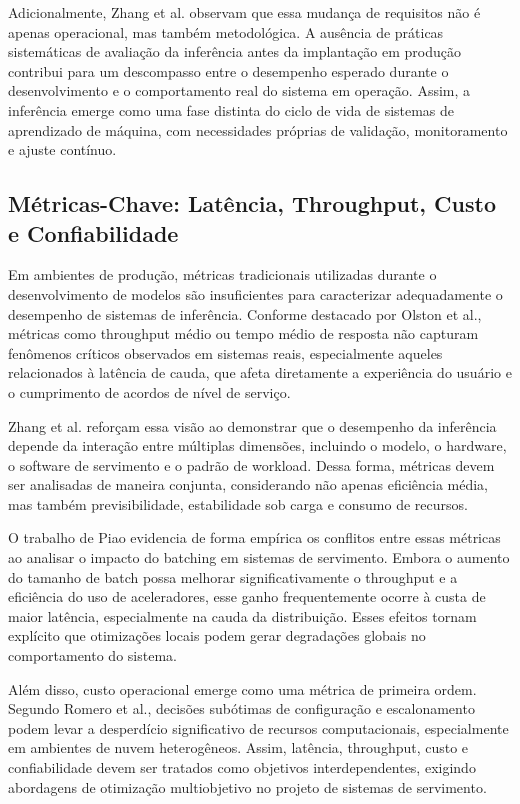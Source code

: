 Adicionalmente, Zhang et al. observam que essa mudança de requisitos não é apenas operacional, mas também metodológica. A ausência de práticas sistemáticas de avaliação da inferência antes da implantação em produção contribui para um descompasso entre o desempenho esperado durante o desenvolvimento e o comportamento real do sistema em operação. Assim, a inferência emerge como uma fase distinta do ciclo de vida de sistemas de aprendizado de máquina, com necessidades próprias de validação, monitoramento e ajuste contínuo.

\subsection{Métricas-Chave: Latência, Throughput, Custo e Confiabilidade}
Em ambientes de produção, métricas tradicionais utilizadas durante o desenvolvimento de modelos são insuficientes para caracterizar adequadamente o desempenho de sistemas de inferência. Conforme destacado por Olston et al., métricas como throughput médio ou tempo médio de resposta não capturam fenômenos críticos observados em sistemas reais, especialmente aqueles relacionados à latência de cauda, que afeta diretamente a experiência do usuário e o cumprimento de acordos de nível de serviço.

Zhang et al. reforçam essa visão ao demonstrar que o desempenho da inferência depende da interação entre múltiplas dimensões, incluindo o modelo, o hardware, o software de servimento e o padrão de workload. Dessa forma, métricas devem ser analisadas de maneira conjunta, considerando não apenas eficiência média, mas também previsibilidade, estabilidade sob carga e consumo de recursos.

O trabalho de Piao evidencia de forma empírica os conflitos entre essas métricas ao analisar o impacto do batching em sistemas de servimento. Embora o aumento do tamanho de batch possa melhorar significativamente o throughput e a eficiência do uso de aceleradores, esse ganho frequentemente ocorre à custa de maior latência, especialmente na cauda da distribuição. Esses efeitos tornam explícito que otimizações locais podem gerar degradações globais no comportamento do sistema.

Além disso, custo operacional emerge como uma métrica de primeira ordem. Segundo Romero et al., decisões subótimas de configuração e escalonamento podem levar a desperdício significativo de recursos computacionais, especialmente em ambientes de nuvem heterogêneos. Assim, latência, throughput, custo e confiabilidade devem ser tratados como objetivos interdependentes, exigindo abordagens de otimização multiobjetivo no projeto de sistemas de servimento.

